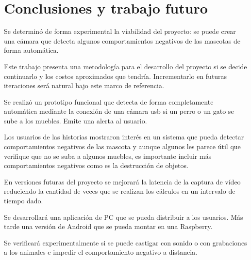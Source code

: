 \section{Conclusiones y trabajo futuro}
\label{sec:conclusiones}

Se determinó de forma experimental la viabilidad del proyecto: se puede crear una cámara que detecta algunos comportamientos negativos de las mascotas de forma automática.

Este trabajo presenta una metodología para el desarrollo del proyecto si se decide continuarlo y los costos aproximados que tendría. Incrementarlo en futuras iteraciones será natural bajo este marco de referencia.


Se realizó un prototipo funcional que detecta de forma completamente automática mediante la conexión de una cámara usb si un perro o un gato se sube a los muebles. Emite una alerta al usuario.

Los usuarios de las historias mostraron interés en un sistema que pueda detectar comportamientos negativos de las mascota y aunque algunos les parece útil que verifique que no se suba a algunos muebles, es importante incluir más comportamientos negativos como es la destrucción de objetos.


En versiones futuras del proyecto se mejorará la latencia de la captura de vídeo reduciendo la cantidad de veces que se realizan los cálculos en un intervalo de tiempo dado. 

Se desarrollará una aplicación de PC que se pueda distribuir a los usuarios. Más tarde una versión de Android que se pueda montar en una Raspberry.

Se verificará experimentalmente si se puede castigar con sonido o con grabaciones a los animales e impedir el comportamiento negativo a distancia.

